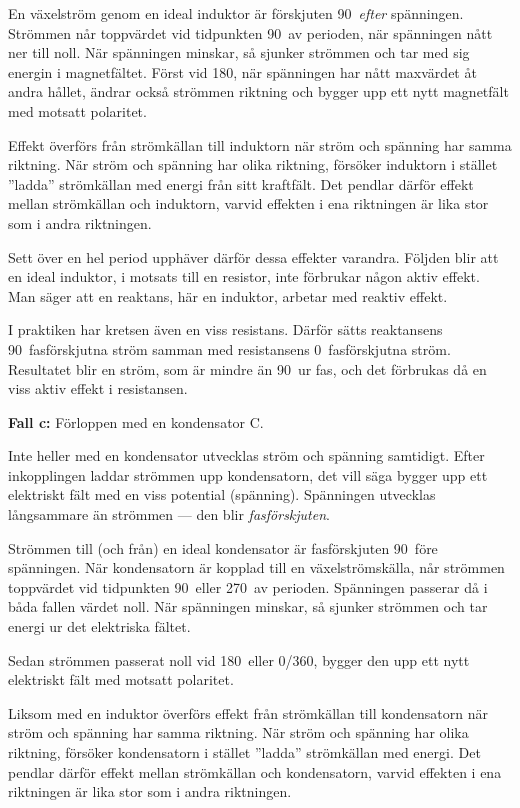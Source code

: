 En växelström genom en ideal induktor är förskjuten 90\degree~\emph{efter}
spänningen.
Strömmen når toppvärdet vid tidpunkten 90\degree~av perioden, när spänningen
nått ner till noll.
När spänningen minskar, så sjunker strömmen och tar med sig energin i
magnetfältet.
Först vid 180\degree, när spänningen har nått maxvärdet åt andra hållet, ändrar
också strömmen riktning och bygger upp ett nytt magnetfält med motsatt
polaritet.

Effekt överförs från strömkällan till induktorn när ström och spänning har samma
riktning.
När ström och spänning har olika riktning, försöker induktorn i stället
''ladda'' strömkällan med energi från sitt kraftfält.
Det pendlar därför effekt mellan strömkällan och induktorn, varvid effekten i
ena riktningen är lika stor som i andra riktningen.

Sett över en hel period upphäver därför dessa effekter varandra.
Följden blir att en ideal induktor, i motsats till en resistor, inte förbrukar
någon aktiv effekt.
Man säger att en reaktans, här en induktor, arbetar med reaktiv effekt.

I praktiken har kretsen även en viss resistans.
Därför sätts reaktansens 90\degree~fasförskjutna ström samman med resistansens
0\degree~fasförskjutna ström.
Resultatet blir en ström, som är mindre än 90\degree~ur fas, och det förbrukas
då en viss aktiv effekt i resistansen.

\textbf{Fall c:} Förloppen med en kondensator C.

Inte heller med en kondensator utvecklas ström och spänning samtidigt.
Efter inkopplingen laddar strömmen upp kondensatorn, det vill säga bygger upp ett
elektriskt fält med en viss potential (spänning).
Spänningen utvecklas långsammare än strömmen --- den blir \emph{fasförskjuten}.

Strömmen till (och från) en ideal kondensator är fasförskjuten 90\degree~före
spänningen.
När kondensatorn är kopplad till en växelströmskälla, når strömmen toppvärdet
vid tidpunkten 90\degree~eller 270\degree~av perioden.
Spänningen passerar då i båda fallen värdet noll.
När spänningen minskar, så sjunker strömmen och tar energi ur det elektriska
fältet.

Sedan strömmen passerat noll vid 180\degree~eller 0\degree/360\degree, bygger
den upp ett nytt elektriskt fält med motsatt polaritet.

Liksom med en induktor överförs effekt från strömkällan till kondensatorn när
ström och spänning har samma riktning.
När ström och spänning har olika riktning, försöker kondensatorn i stället
''ladda'' strömkällan med energi.
Det pendlar därför effekt mellan strömkällan och kondensatorn, varvid effekten i
ena riktningen är lika stor som i andra riktningen.

